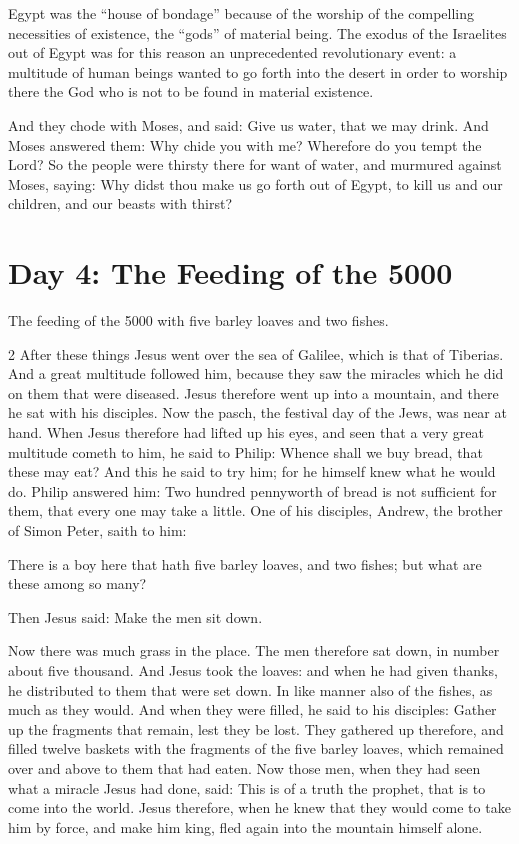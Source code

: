 \begin{quotex}
Egypt was the ``house of bondage'' because of the worship of the compelling necessities of existence, the ``gods'' of material being. The exodus of the Israelites out of Egypt was for this reason an unprecedented revolutionary event: a multitude of human beings wanted to go forth into the desert in order to worship there the God who is not to be found in material existence. 

And they chode with Moses, and said: Give us water, that we may drink. And Moses answered them: Why chide you with me? Wherefore do you tempt the Lord? So the people were thirsty there for want of water, and murmured against Moses, saying: Why didst thou make us go forth out of Egypt, to kill us and our children, and our beasts with thirst? 

\end{quotex}

\section{Day 4: The Feeding of the 5000}

The feeding of the 5000 with five barley loaves and two fishes.

\begin{multicols}{2}\small
After these things Jesus went over the sea of Galilee, which is that of Tiberias. And a great multitude followed him, because they saw the miracles which he did on them that were diseased. Jesus therefore went up into a mountain, and there he sat with his disciples. Now the pasch, the festival day of the Jews, was near at hand. When Jesus therefore had lifted up his eyes, and seen that a very great multitude cometh to him, he said to Philip: Whence shall we buy bread, that these may eat? And this he said to try him; for he himself knew what he would do. Philip answered him: Two hundred pennyworth of bread is not sufficient for them, that every one may take a little. One of his disciples, Andrew, the brother of Simon Peter, saith to him:

There is a boy here that hath five barley loaves, and two fishes; but what are these among so many?

Then Jesus said: Make the men sit down.

Now there was much grass in the place. The men therefore sat down, in number about five thousand. And Jesus took the loaves: and when he had given thanks, he distributed to them that were set down. In like manner also of the fishes, as much as they would. And when they were filled, he said to his disciples: Gather up the fragments that remain, lest they be lost. They gathered up therefore, and filled twelve baskets with the fragments of the five barley loaves, which remained over and above to them that had eaten. Now those men, when they had seen what a miracle Jesus had done, said: This is of a truth the prophet, that is to come into the world. Jesus therefore, when he knew that they would come to take him by force, and make him king, fled again into the mountain himself alone. 
\end{multicols}

